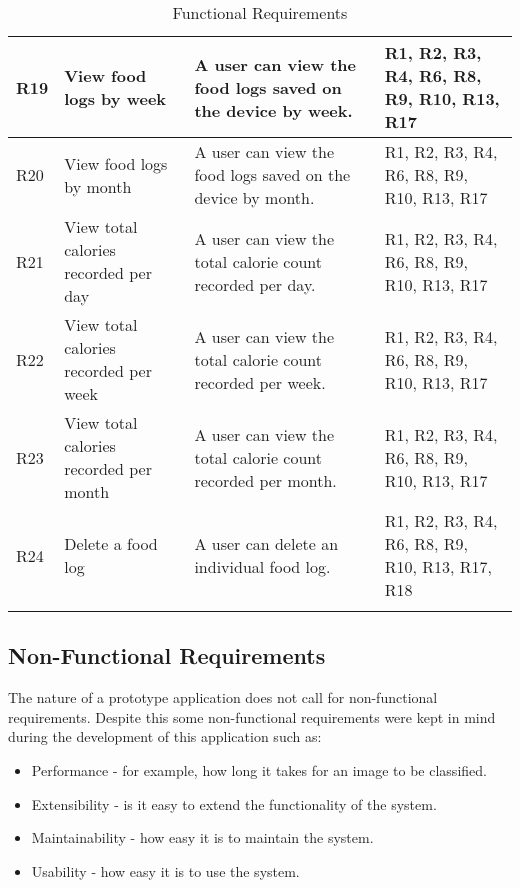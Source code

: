 \begin{longtable}{|p{.75cm}|p{3.5cm}|p{6cm}|p{2.5cm}|}
R19         & View food logs by week                                      & A user can view the food logs saved on the device by week.                                              & R1, R2, R3, R4, R6, R8, R9, R10, R13, R17      \\ \hline
R20         & View food logs by month                                     & A user can view the food logs saved on the device by month.                                             & R1, R2, R3, R4, R6, R8, R9, R10, R13, R17      \\ \hline
R21         & View total calories recorded per day                        & A user can view the total calorie count recorded per day.                                               & R1, R2, R3, R4, R6, R8, R9, R10, R13, R17      \\ \hline
R22         & View total calories recorded per week                       & A user can view the total calorie count recorded per week.                                              & R1, R2, R3, R4, R6, R8, R9, R10, R13, R17      \\ \hline
R23         & View total calories recorded per month                      & A user can view the total calorie count recorded per month.                                             & R1, R2, R3, R4, R6, R8, R9, R10, R13, R17      \\ \hline
R24         & Delete a food log                                           & A user can delete an individual food log.                                                               & R1, R2, R3, R4, R6, R8, R9, R10, R13, R17, R18 \\ \hline
\caption{Functional Requirements}
\label{requirements}
\end{longtable}

\tocless\subsection{Non-Functional Requirements}
The nature of a prototype application does not call for non-functional requirements.
Despite this some non-functional requirements were kept in mind during the development of this application such as:
\begin{itemize}
	\item{Performance - for example, how long it takes for an image to be classified.}
	\item{Extensibility - is it easy to extend the functionality of the system.}
	\item{Maintainability - how easy it is to maintain the system.}
	\item{Usability - how easy it is to use the system.}
\end{itemize}

\clearpage